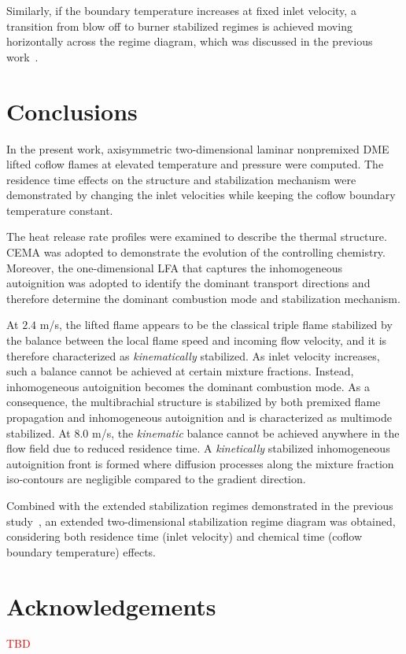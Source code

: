 \documentclass{wssci}
\begin{document}
Similarly, if the boundary temperature increases at fixed inlet velocity, a transition from blow off to burner stabilized regimes is achieved moving horizontally across the regime diagram, which was discussed in the previous work~\cite{deng15}.     


\section{Conclusions}

In the present work, axisymmetric two-dimensional laminar nonpremixed DME lifted coflow flames at elevated temperature and pressure were computed.  The residence time effects on the structure and stabilization mechanism were demonstrated by changing the inlet velocities while keeping the coflow boundary temperature constant.

The heat release rate profiles were examined to describe the thermal structure.  CEMA was adopted to demonstrate the evolution of the controlling chemistry.  Moreover, the one-dimensional LFA that captures the inhomogeneous autoignition was adopted to identify the dominant transport directions and therefore determine the dominant combustion mode and stabilization mechanism.

At $2.4$ m/s, the lifted flame appears to be the classical triple flame stabilized by the balance between the local flame speed and incoming flow velocity, and it is therefore characterized as \emph {kinematically} stabilized.  As inlet velocity increases, such a balance cannot be achieved at certain mixture fractions.  Instead, inhomogeneous autoignition becomes the dominant combustion mode.  As a consequence, the multibrachial structure is stabilized by both premixed flame propagation and inhomogeneous autoignition and is characterized as multimode stabilized.  At $8.0$ m/s, the \emph{kinematic} balance cannot be achieved anywhere in the flow field due to reduced residence time.  A \emph {kinetically} stabilized inhomogeneous autoignition front is formed where diffusion processes along the mixture fraction iso-contours are negligible compared to the gradient direction.

Combined with the extended stabilization regimes demonstrated in the previous study~\cite{deng15}, an extended two-dimensional stabilization regime diagram was obtained, considering both residence time (inlet velocity) and chemical time (coflow boundary temperature) effects.  


\section{Acknowledgements}

\textcolor{red}{TBD}


 
\end{document}
